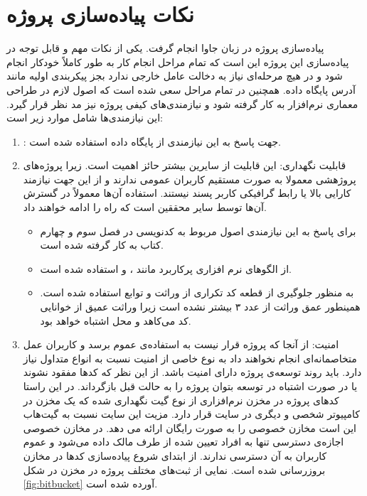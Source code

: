 \section{نکات پیاده‌سازی پروژه}

پیاده‌سازی پروژه در زبان جاوا انجام گرفت. یکی از نکات مهم و قابل توجه در پیاده‌سازی این پروژه این است که تمام مراحل انجام کار  به طور کاملاً خودکار انجام شود و در هیچ مرحله‌ای نیاز به دخالت عامل خارجی  ندارد بجز پیکربندی اولیه مانند آدرس پایگاه داده. همچنین در تمام مراحل سعی شده است که  اصول لازم در طراحی معماری نرم‌افزار به کار گرفته شود و نیازمندی‌های کیفی پروژه نیز مد نظر قرار گیرد. این نیازمندی‌ها شامل موارد زیر است:
\begin{enumerate}
\item 
{} : جهت پاسخ به این نیازمندی از پایگاه داده استفاده شده است.
\item
قابلیت نگهداری: این قابلیت از سایرین بیشتر حائز اهمیت است. زیرا پروژه‌های پروژهشی معمولا به صورت مستقیم کاربران عمومی ندارند و از این جهت نیازمند کارایی بالا یا رابط گرافیکی کاربر پسند نیستند. استفاده آن‌ها معمولاً در گسترش آن‌ها توسط سایر محققین است که راه را ادامه خواهند داد. 
\begin{itemize}
\item

 برای پاسخ به این نیازمندی اصول مربوط به کدنویسی  در فصل سوم و چهارم کتاب  \cite{martin2009clean} به کار گرفته شده است.
 \item
 از الگوهای نرم افزاری پرکاربرد مانند ،   و  استفاده شده است.
 \item
 به منظور جلوگیری از قطعه کد تکراری از وراثت و توابع  استفاده شده است. همینطور عمق وراثت از عدد ۳ بیشتر نشده است زیرا وراثت عمیق از خوانایی کد می‌کاهد و محل اشتباه خواهد بود. 
\end{itemize}
\item
امنیت: از آنجا که پروژه قرار نیست به استفاده‌ی عموم برسد و کاربران عمل متخاصمانه‌ای انجام نخواهند داد   به نوع خاصی از امنیت  نسبت به انواع متداول نیاز دارد.  باید روند توسعه‌ی پروژه دارای امنیت باشد. از این نظر که کدها مفقود نشوند یا در صورت اشتباه در توسعه بتوان پروژه را به حالت قبل بازگرداند. در این راستا کدهای پروژه در مخزن نرم‌افزاری از نوع گیت نگهداری شده که یک مخزن در کامپیوتر شخصی و دیگری در سایت  
قرار دارد. مزیت این سایت نسبت به گیت‌هاب این است مخازن خصوصی  را به صورت رایگان ارائه می دهد. در مخازن خصوصی  اجازه‌ی دسترسی تنها به  افراد تعیین شده از طرف مالک  داده می‌شود و عموم کاربران به آن دسترسی ندارند. از ابتدای شروع پیاده‌سازی کدها در مخازن بروزرسانی شده است. نمایی از ثبت‌های مختلف پروژه در مخزن در شکل \ref{fig:bitbucket}
آورده شده است. 
\end{enumerate}

